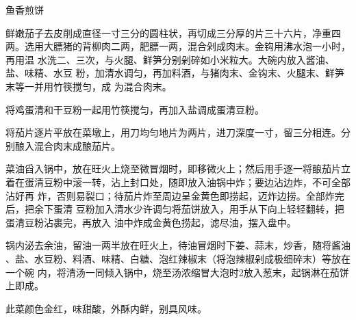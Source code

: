 \begin{recipe}{鱼香煎饼}

\ingredients


\preparation

\step 鲜嫩茄子去皮削成直径一寸三分的圆柱状，再切成三分厚的片三十六片，净重四
两。选用大膘猪的背柳肉二两，肥膘一两，混合剁成肉末。金钩用沸水泡一小时，再用温
水洗二、三次，与火腿、鲜笋分别剁碎如小米粒大。大碗内放入酱油、盐、味精、水豆
粉，加清水调匀，再加料酒，与猪肉末、金钩末、火腿末、鲜笋末等一并用竹筷搅匀，成
为混合肉末。

\step 将鸡蛋清和干豆粉一起用竹筷搅匀，再加入盐调成蛋清豆粉。

\step 将茄片逐片平放在菜墩上，用刀均匀地片为两片，进刀深度一寸，留三分相连。分
别酿入混合肉末成酿茄片。

\step 菜油舀入锅中，放在旺火上烧至微冒烟时，即移微火上；然后用手逐一将酿茄片立
着在蛋清豆粉中滚一转，沾上封口处，随即放入油锅中炸；要边沾边炸，不可全部沾好再
炸，否则易裂口；待茄片炸至周边呈金黄色即捞起，迈炸边捞。全部炸完后，把余下蛋清
豆粉加入清水少许调匀将茄饼放入，用手从下向上轻轻翻转，把蛋清豆粉沾裹完，再放入
油中炸成金黄色捞起，滤尽油，摆入盘中。

\step 锅内泌去余油，留油一两半放在旺火上，待油冒烟时下姜、蒜末，炒香，随将酱油
、盐、水豆粉、料酒、味精、白糖、泡红辣椒末（将泡辣椒剁成极细碎末）等放在一个碗
内，将清汤一同倾入锅中，烧至汤浓缩冒大泡时2放入葱末，起锅淋在茄饼上即成。

\features

此菜颜色金红，味甜酸，外酥内鲜，别具风味。

\end{recipe}

